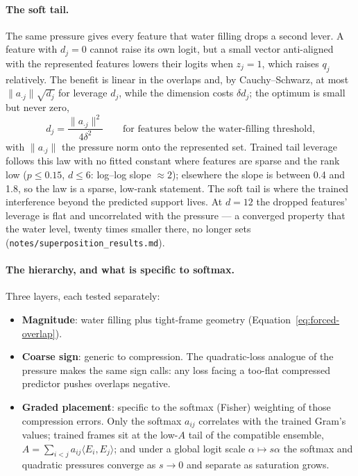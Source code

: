 \paragraph{The soft tail.}
The same pressure gives every feature that water filling drops a second lever. A
feature with \(d_j=0\) cannot raise its own logit, but a small vector anti-aligned
with the represented features lowers their logits when \(z_j=1\), which raises
\(q_j\) relatively. The benefit is linear in the overlaps and, by Cauchy--Schwarz,
at most \(\|a_{\cdot j}\|\sqrt{d_j}\) for leverage \(d_j\), while the dimension costs
\(\delta d_j\); the optimum is small but never zero,
\begin{equation}
\boxed{
d_j=\frac{\|a_{\cdot j}\|^2}{4\delta^2}
\qquad\text{for features below the water-filling threshold,}
}
\label{eq:soft-tail}
\end{equation}
with \(\|a_{\cdot j}\|\) the pressure norm onto the represented set. Trained tail
leverage follows this law with no fitted constant where features are sparse and the
rank low (\(p\le0.15\), \(d\le6\): log--log slope \(\approx2\)); elsewhere the slope is
between 0.4 and 1.8, so the law is a sparse, low-rank statement. The soft tail is where
the trained interference beyond the predicted support lives. At \(d=12\) the dropped
features' leverage is flat and uncorrelated with the pressure — a converged property
that the water level, twenty times smaller there, no longer sets
(\texttt{notes/superposition\_results.md}).

\paragraph{The hierarchy, and what is specific to softmax.}
Three layers, each tested separately:
\begin{itemize}
\item \textbf{Magnitude}: water filling plus tight-frame geometry
(Equation~\eqref{eq:forced-overlap}).
\item \textbf{Coarse sign}: generic to compression. The quadratic-loss analogue of
the pressure makes the same sign calls: any loss facing a too-flat compressed
predictor pushes overlaps negative.
\item \textbf{Graded placement}: specific to the softmax (Fisher) weighting of those
compression errors. Only the softmax \(a_{ij}\) correlates with the trained Gram's
values; trained frames sit at the low-\(A\) tail of the compatible ensemble,
\(A=\sum_{i<j}a_{ij}\langle E_i,E_j\rangle\); and under a global logit scale
\(\alpha\mapsto s\alpha\) the softmax and quadratic pressures converge as \(s\to0\)
and separate as saturation grows.
\end{itemize}

